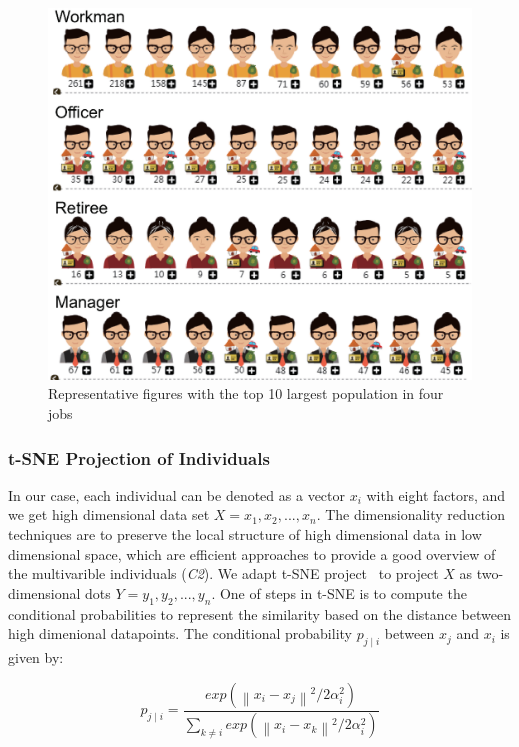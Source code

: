 \documentclass{ieeeaccess}
\begin{document}
\begin{figure}[htb!]
 \centering %
 \includegraphics[width=\columnwidth]{pictures/design_example}
 \caption{Representative figures with the top 10 largest population in four jobs}
 \label{fig:div_example}
\end{figure}

\subsubsection{t-SNE Projection of Individuals}

In our case, each individual can be denoted as a vector $x_i$ with eight factors, and we get high dimensional data set $X={x_1, x_2, ..., x_n}$. The dimensionality reduction techniques are to preserve the local structure of high dimensional data in low dimensional space, which are efficient approaches to provide a good overview of the multivarible individuals (\textit{C2}). We adapt t-SNE project~\cite{maaten2008visualizing} to project $X$ as two-dimensional dots $Y={y_1, y_2, ..., y_n}$. One of steps in t-SNE is to compute the conditional probabilities to represent the similarity based on the distance between high dimenional datapoints. The conditional probability $p_{j\mid i}$ between $x_j$ and $x_i$ is given by:

\begin{equation}
p_{j\mid i} = \frac{exp({\left \| x_i - x_j \right \|}^2/2\alpha_i ^{2})}{\sum _{k\neq i}exp({\left \| x_i - x_k \right \|}^2/2\alpha_i ^{2})}
\end{equation}
\end{document}
